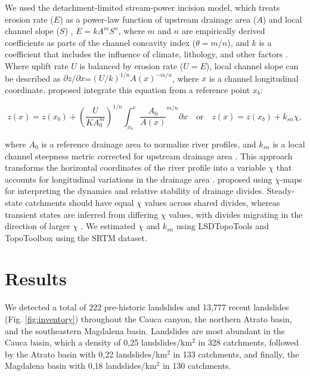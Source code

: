 \documentclass[draft]{agujournal2019}
\begin{document}
\par We used the detachment-limited stream-power incision model, which treats erosion rate ($E$) as a power-law function of upstream drainage area ($A$) and local channel slope ($S$) \cite{Howard1983, Whipple1999}, $E=kA^mS^n$, where $m$ and $n$ are empirically derived coefficients as parts of the channel concavity index ($\theta=m/n$), and $k$ is a coefficient that includes the influence of climate, lithology, and other factors \cite{Whipple1999}. Where uplift rate $U$ is balanced by erosion rate ($U=E$), local channel slope can be described as $\partial z/\partial x$=$(U/k)^{1/n}A(x)^{-m/n}$, where $x$ is a channel longitudinal coordinate.  proposed integrate this equation from a reference point $x_b$:  

\begin{linenomath*}
\begin{equation}
    z(x)= z(x_b)+\left(\frac{U}{KA_0^m}\right)^{1/n}\int_{x_b}^{x} \frac{A_0}{A(x)}^{m/n} \partial{x} \quad \text{or} \quad z(x)=z(x_b)+k_{sn}\chi,
\end{equation}
\end{linenomath*}

where $A_0$ is a reference drainage area to normalize river profiles, and $k_{sn}$ is a local channel steepness metric corrected for upstream drainage area \cite{whipple2017}. This approach transforms the horizontal coordinates of the river profile into a variable $\chi$ that accounts for longitudinal variations in the drainage area \cite{Mudd2014}.  proposed using $\chi$-maps for interpreting the dynamics and relative stability of drainage divides. Steady-state catchments should have equal $\chi$ values across shared divides, whereas transient states are inferred from differing $\chi$ values, with divides migrating in the direction of larger $\chi$ \cite{Willett2014}. We estimated $\chi$ and $k_{sn}$ using LSDTopoTools \cite{Mudd2014} and TopoToolbox \cite{Schwanghart_2014} using the SRTM dataset.


\section{Results}

\par We detected a total of 222 pre-historic landslides and 13,777 recent landslides (Fig. \ref{fig:inventory}) throughout the Cauca canyon, the northern Atrato basin, and the southeastern Magdalena basin. Landslides are most abundant in the Cauca basin, which a density of 0,25 landslides/km$^2$ in 328 catchments, followed by the Atrato basin with 0,22 landslides/km$^2$ in 133 catchments, and finally, the Magdalena basin with 0,18 landslides/km$^2$ in 130 catchments.
\end{document}

